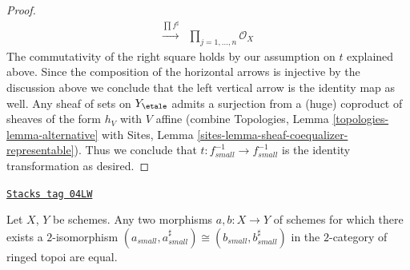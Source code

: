 \begin{proof}
$$\begin{array}{ccc}
\overset{\prod f^\sharp}{\longrightarrow} & \prod_{j = 1, \ldots, n} \mathcal{O}_X\end{array}
$$
The commutativity of the right square holds by our assumption on $t$
explained above.
Since the composition of the horizontal arrows is injective
by the discussion above we conclude that the left vertical arrow
is the identity map as well. Any sheaf of sets on
$Y_\etale$ admits a surjection from a (huge) coproduct of sheaves
of the form $h_V$ with $V$ affine (combine
Topologies, Lemma \ref{topologies-lemma-alternative}
with
Sites, Lemma \ref{sites-lemma-sheaf-coequalizer-representable}).
Thus we conclude that $t : f_{small}^{-1} \to f_{small}^{-1}$
is the identity transformation as desired.
\end{proof}

\begin{lemma}[Faithful]
\label{etale-cohomology-lemma-faithful}
\href{https://stacks.math.columbia.edu/tag/04LW}{\texttt{Stacks tag 04LW}}

Let $X$, $Y$ be schemes.
Any two morphisms $a, b : X \to Y$ of schemes
for which there exists a $2$-isomorphism
$(a_{small}, a_{small}^\sharp) \cong (b_{small}, b_{small}^\sharp)$
in the $2$-category of ringed topoi are equal.
\end{lemma}

